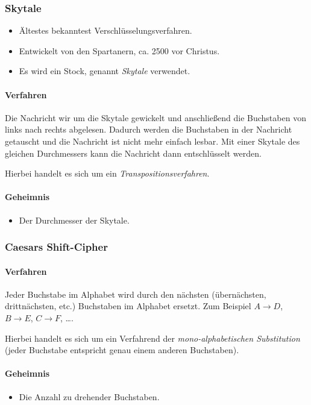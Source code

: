 		\subsubsection{Skytale} %
			\begin{itemize}
				\item Ältestes bekanntest Verschlüsselungsverfahren.
				\item Entwickelt von den Spartanern, ca. 2500 vor Christus.
				\item Es wird ein Stock, genannt \textit{Skytale} verwendet.
			\end{itemize}

			\paragraph{Verfahren}
				Die Nachricht wir um die Skytale gewickelt und anschließend die Buchstaben von links nach rechts abgelesen. Dadurch werden die Buchstaben in der Nachricht getauscht und die Nachricht ist nicht mehr einfach lesbar. Mit einer Skytale des gleichen Durchmessers kann die Nachricht dann entschlüsselt werden.

				Hierbei handelt es sich um ein \textit{Transpositionsverfahren}.

			\paragraph{Geheimnis}
				\begin{itemize}
					\item Der Durchmesser der Skytale.
				\end{itemize}

		\subsubsection{Caesars Shift-Cipher}
			\paragraph{Verfahren}
				Jeder Buchstabe im Alphabet wird durch den nächsten (übernächsten, drittnächsten, etc.) Buchstaben im Alphabet ersetzt. Zum Beispiel \( A \rightarrow D \), \( B \rightarrow E \), \( C \rightarrow F \), \dots.

				Hierbei handelt es sich um ein Verfahrend der \textit{mono-alphabetischen Substitution} (jeder Buchstabe entspricht genau einem anderen Buchstaben).

			\paragraph{Geheimnis}
				\begin{itemize}
					\item Die Anzahl zu drehender Buchstaben.
				\end{itemize}

